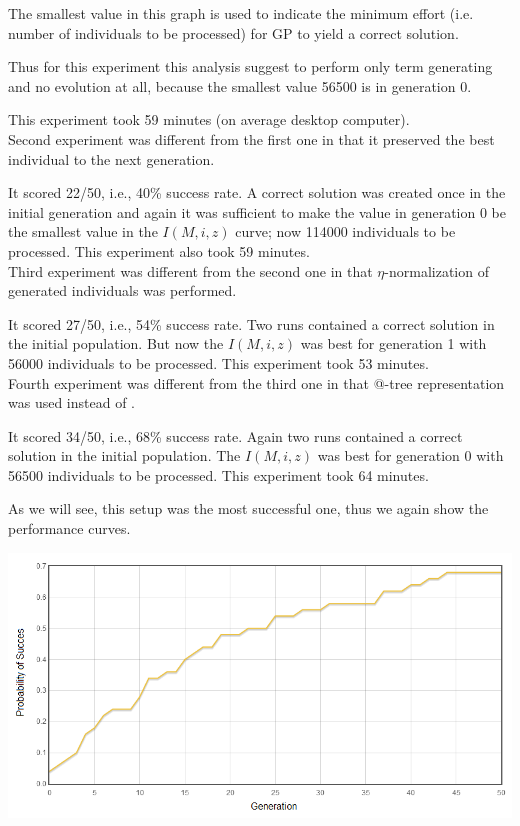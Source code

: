 \documentclass[12pt,a4paper]{report}
\makeatletter
\newcommand{\atTree}{@-tree\xspace}
\makeatother
\begin{document}
The smallest value in this graph is used to indicate the minimum effort
(i.e. number of individuals to be processed) for GP to yield a correct solution.

Thus for this experiment this analysis suggest
to perform only term generating and no evolution at all, 
because the smallest value 56500 is in generation 0.

This experiment took 59 minutes (on average desktop computer).\\

Second experiment was different from the first one in that it 
preserved the best individual to the next generation.

It scored 22/50, i.e., 40\% success rate. A correct solution was
created once in the initial generation and again it was
sufficient to make the value in generation 0
be the smallest value in the $I(M,i,z)$ curve; now 114000
 individuals to be processed.
This experiment also took 59 minutes.\\


Third experiment was different from the second one in that 
$\eta$-normalization of generated individuals was performed.

It scored 27/50, i.e., 54\% success rate. 
Two runs contained a correct solution in the initial population.
But now the $I(M,i,z)$ was best for generation 1 with 56000
 individuals to be processed.
This experiment took 53 minutes.\\


Fourth experiment was different from the third one in that
\atTree representation was used instead of \sexprTree.

It scored 34/50, i.e., 68\% success rate. Again two runs
contained a correct solution in the initial population.
The $I(M,i,z)$ was best for generation 0 with 56500 
individuals to be processed.
This experiment took 64 minutes.

As we will see, this setup was the most successful one,
thus we again show the performance curves.

\includegraphics[scale=0.65]{reports/ep/report4/probabs.png}
\end{document}
